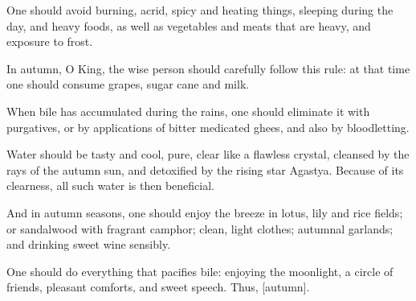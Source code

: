 \begin{translation}
\item[20cd--21ab]
One should avoid burning, acrid, spicy and heating things, sleeping during the day, and heavy foods, as well as vegetables and meats that are heavy, and exposure to frost.


\item[21cd--22ab] %
In autumn, O King, the wise person should carefully follow this rule:
at that time one should consume grapes, sugar cane and milk. %

\item[22cd--23ab]
When bile has accumulated during the rains, one should eliminate it with purgatives, or by applications of bitter medicated ghees, and also by bloodletting.


\item[23cd--24] %
Water should be tasty and cool, pure, clear like a flawless crystal, cleansed by the rays of the autumn sun, and detoxified by the rising star Agastya. Because of its clearness, all such water is then beneficial.

\item[25--26ab] %
And in autumn seasons, one should enjoy the breeze in lotus, lily and rice fields; or  sandalwood with fragrant camphor; clean, light clothes; autumnal garlands; and  drinking sweet wine sensibly.
%

\item[26cd--27ab] %
One should do everything that pacifies bile: enjoying the moonlight, a circle of friends, pleasant comforts, and sweet speech. Thus, [autumn].


\end{translation}
